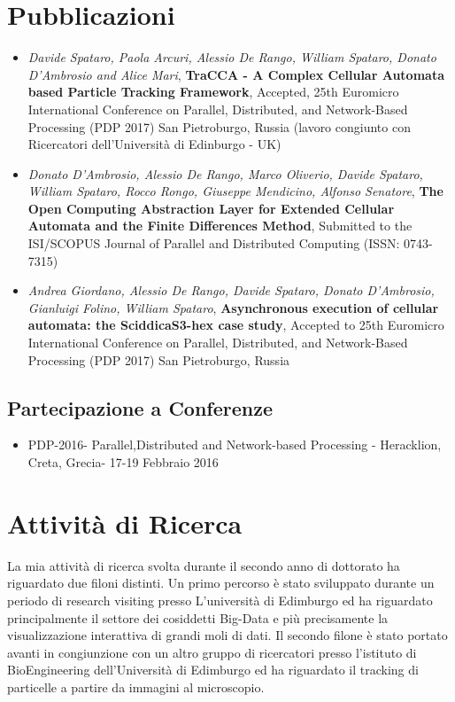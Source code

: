 \documentclass[a4paper,11pt]{paper}
\begin{document}
\section{Pubblicazioni}
\begin{itemize}
\item \textit{Davide Spataro, Paola Arcuri, Alessio De Rango, William Spataro, Donato
D’Ambrosio and Alice Mari}, \textbf{TraCCA - A Complex Cellular Automata
based Particle Tracking Framework}, Accepted, 25th Euromicro
International Conference on Parallel, Distributed, and Network-Based
Processing (PDP 2017) San Pietroburgo, Russia (lavoro congiunto con
Ricercatori dell’Università di Edinburgo - UK)

	\item \textit{Donato D’Ambrosio, Alessio De Rango, Marco Oliverio, Davide Spataro,
William Spataro, Rocco Rongo, Giuseppe Mendicino, Alfonso Senatore},
\textbf{The Open Computing Abstraction Layer for Extended Cellular
Automata and the Finite Differences Method}, Submitted to the
ISI/SCOPUS Journal of Parallel and Distributed Computing (ISSN: 0743-
7315)

\item \textit{Andrea Giordano, Alessio De Rango, Davide Spataro, Donato D’Ambrosio,
Gianluigi Folino, William Spataro}, \textbf{Asynchronous execution
of cellular automata: the SciddicaS3-hex case study}, Accepted to
25th Euromicro International Conference on Parallel, Distributed, and
Network-Based Processing (PDP 2017) San Pietroburgo, Russia

\end{itemize}	

\subsection{Partecipazione a  Conferenze}

\begin{itemize}
  \item PDP-2016- Parallel,Distributed and Network-based Processing - Heracklion, Creta,
  Grecia- 17-19 Febbraio  2016
\end{itemize}



\section{Attività di Ricerca}
La mia attività di ricerca svolta durante il secondo anno di dottorato ha riguardato due filoni distinti. Un primo percorso è stato sviluppato durante un periodo di research visiting presso L'università di Edimburgo ed ha riguardato principalmente il settore dei cosiddetti Big-Data e più precisamente la visualizzazione interattiva di grandi moli di dati.
Il secondo filone è stato portato avanti in congiunzione con un altro gruppo di ricercatori presso l'istituto di BioEngineering dell'Università di Edimburgo ed ha riguardato il tracking di particelle a partire da immagini al microscopio.
\end{document}

